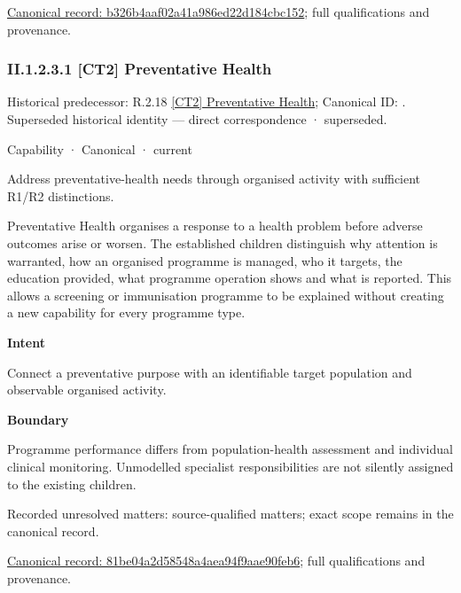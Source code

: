 {\footnotesize \href{../../../../../../../continuum/strategy/capability/b326b4aaf02a41a986ed22d184cbc152.md}{Canonical record: b326b4aaf02a41a986ed22d184cbc152}; full qualifications and provenance.}\par
\subsubsection*{II.1.2.3.1 [CT2] Preventative Health}
\label{navigation:II.1.2.3.1}

{\small Historical predecessor: R.2.18 \hyperref[element:80affa7bcd284ecbbcbc5092f8497ddf]{[CT2] Preventative Health}; Canonical ID: \texttt{}. Superseded historical identity — direct correspondence · superseded.}\par
\label{element:81be04a2d58548a4aea94f9aae90feb6}
{\small Capability · Canonical · current}\par

Address preventative-health needs through organised activity with sufficient R1/R2 distinctions.



Preventative Health organises a response to a health problem before adverse outcomes arise or worsen. The established children distinguish why attention is warranted, how an organised programme is managed, who it targets, the education provided, what programme operation shows and what is reported. This allows a screening or immunisation programme to be explained without creating a new capability for every programme type.



\textbf{Intent}



Connect a preventative purpose with an identifiable target population and observable organised activity.



\textbf{Boundary}



Programme performance differs from population-health assessment and individual clinical monitoring. Unmodelled specialist responsibilities are not silently assigned to the existing children.


{\small Recorded unresolved matters: source-qualified matters; exact scope remains in the canonical record.}\par
{\footnotesize \href{../../../../../../../continuum/strategy/capability/81be04a2d58548a4aea94f9aae90feb6.md}{Canonical record: 81be04a2d58548a4aea94f9aae90feb6}; full qualifications and provenance.}\par
